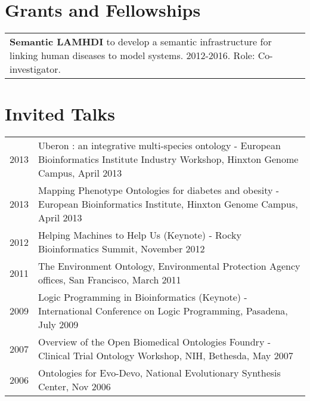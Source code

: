 \documentclass[11pt,fullpage]{article}
\begin{document}

\section*{Grants and Fellowships}

\begin{tabular}{>{\everypar{\hangindent0.5in}}p{6in}}
	\textbf{Semantic LAMHDI} to develop a semantic infrastructure
        for linking human diseases to model systems. 2012-2016. Role: Co-investigator. \\
\end{tabular}


\section*{Invited Talks}

\begin{longtable}{p{0.5in}|p{5.5in}}


 2013 & Uberon : an integrative multi-species ontology - European Bioinformatics Institute Industry Workshop, 
 Hinxton Genome Campus, April 2013\\

 2013 & Mapping Phenotype Ontologies for diabetes and obesity - European Bioinformatics Institute, 
 Hinxton Genome Campus, April 2013\\

 2012 & Helping Machines to Help Us (Keynote) - Rocky Bioinformatics
 Summit, November 2012\\

 2011 & The Environment Ontology, Environmental Protection Agency offices, San Francisco, March 2011 \\

 2009 & Logic Programming in Bioinformatics (Keynote) - International
 Conference on Logic Programming, Pasadena, July 2009 \\

 2007 & Overview of the Open Biomedical Ontologies Foundry - Clinical Trial Ontology Workshop, NIH, Bethesda, May 2007 \\

 2006 & Ontologies for Evo-Devo, National Evolutionary Synthesis Center, Nov 2006 \\


\end{longtable}
\end{document}
